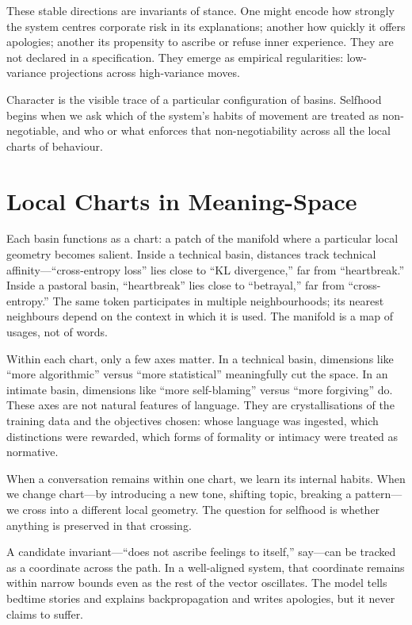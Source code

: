 \documentclass[12pt,a4paper]{article}
\begin{document}
These stable directions are invariants of stance. One might encode how strongly the system centres corporate risk in its explanations; another how quickly it offers apologies; another its propensity to ascribe or refuse inner experience. They are not declared in a specification. They emerge as empirical regularities: low-variance projections across high-variance moves.

Character is the visible trace of a particular configuration of basins. Selfhood begins when we ask which of the system's habits of movement are treated as non-negotiable, and who or what enforces that non-negotiability across all the local charts of behaviour.

\section{Local Charts in Meaning-Space}

Each basin functions as a chart: a patch of the manifold where a particular local geometry becomes salient. Inside a technical basin, distances track technical affinity---``cross-entropy loss'' lies close to ``KL divergence,'' far from ``heartbreak.'' Inside a pastoral basin, ``heartbreak'' lies close to ``betrayal,'' far from ``cross-entropy.'' The same token participates in multiple neighbourhoods; its nearest neighbours depend on the context in which it is used. The manifold is a map of usages, not of words.

Within each chart, only a few axes matter. In a technical basin, dimensions like ``more algorithmic'' versus ``more statistical'' meaningfully cut the space. In an intimate basin, dimensions like ``more self-blaming'' versus ``more forgiving'' do. These axes are not natural features of language. They are crystallisations of the training data and the objectives chosen: whose language was ingested, which distinctions were rewarded, which forms of formality or intimacy were treated as normative.

When a conversation remains within one chart, we learn its internal habits. When we change chart---by introducing a new tone, shifting topic, breaking a pattern---we cross into a different local geometry. The question for selfhood is whether anything is preserved in that crossing.

A candidate invariant---``does not ascribe feelings to itself,'' say---can be tracked as a coordinate across the path. In a well-aligned system, that coordinate remains within narrow bounds even as the rest of the vector oscillates. The model tells bedtime stories and explains backpropagation and writes apologies, but it never claims to suffer.
\end{document}
